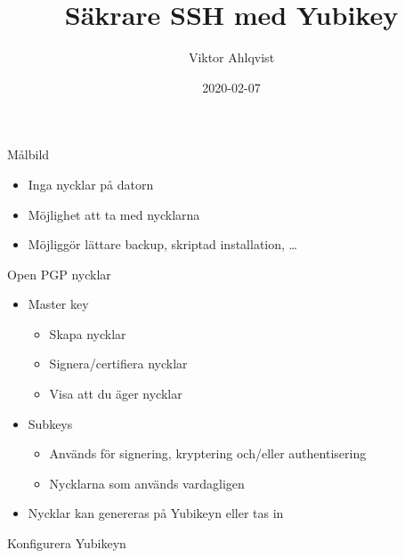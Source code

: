 \documentclass{beamer}
\title{Säkrare SSH med Yubikey}
\date{2020-02-07}
\author{Viktor Ahlqvist}
\institute{Omegapoint kompetensdag}
\begin{document}
\maketitle

\begin{frame}{Målbild}
  \begin{itemize}
    \item Inga nycklar på datorn
    \item Möjlighet att ta med nycklarna
    \item Möjliggör lättare backup, skriptad installation, …
  \end{itemize}
\end{frame}

\begin{frame}{Open PGP nycklar}
  \begin{itemize}
    \item Master key
      \begin{itemize}
        \item Skapa nycklar
        \item Signera/certifiera nycklar
        \item Visa att du äger nycklar
      \end{itemize}
    \item Subkeys
      \begin{itemize}
        \item Används för signering, kryptering och/eller authentisering
        \item Nycklarna som används vardagligen
      \end{itemize}
    \item Nycklar kan genereras på Yubikeyn eller tas in
  \end{itemize}
\end{frame}

\begin{frame}[fragile]{Konfigurera Yubikeyn}
\end{frame}
\end{document}
